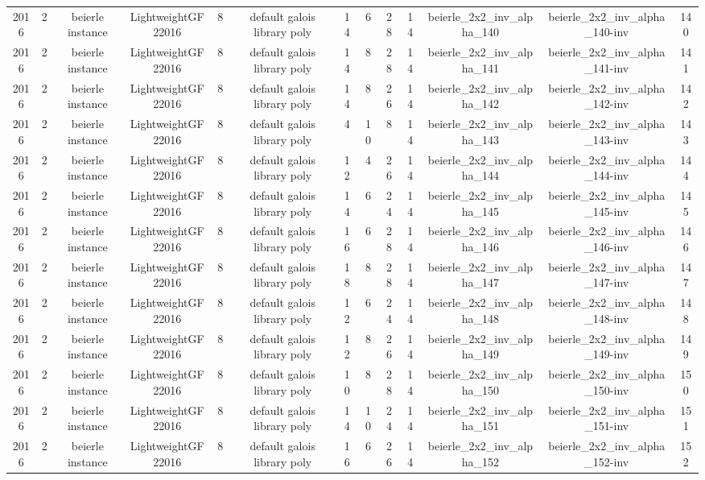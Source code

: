 \begin{tabular}{c c c c c c c c c c c c c}
2016 & 2 & beierle instance & LightweightGF22016 & 8 & default galois library poly & 14 & 6 & 28 & 14 & beierle_2x2_inv_alpha_140 & beierle_2x2_inv_alpha_140-inv & 140 \\
2016 & 2 & beierle instance & LightweightGF22016 & 8 & default galois library poly & 14 & 8 & 28 & 14 & beierle_2x2_inv_alpha_141 & beierle_2x2_inv_alpha_141-inv & 141 \\
2016 & 2 & beierle instance & LightweightGF22016 & 8 & default galois library poly & 14 & 8 & 26 & 14 & beierle_2x2_inv_alpha_142 & beierle_2x2_inv_alpha_142-inv & 142 \\
2016 & 2 & beierle instance & LightweightGF22016 & 8 & default galois library poly & 4 & 10 & 8 & 14 & beierle_2x2_inv_alpha_143 & beierle_2x2_inv_alpha_143-inv & 143 \\
2016 & 2 & beierle instance & LightweightGF22016 & 8 & default galois library poly & 12 & 4 & 26 & 14 & beierle_2x2_inv_alpha_144 & beierle_2x2_inv_alpha_144-inv & 144 \\
2016 & 2 & beierle instance & LightweightGF22016 & 8 & default galois library poly & 14 & 6 & 24 & 14 & beierle_2x2_inv_alpha_145 & beierle_2x2_inv_alpha_145-inv & 145 \\
2016 & 2 & beierle instance & LightweightGF22016 & 8 & default galois library poly & 16 & 6 & 28 & 14 & beierle_2x2_inv_alpha_146 & beierle_2x2_inv_alpha_146-inv & 146 \\
2016 & 2 & beierle instance & LightweightGF22016 & 8 & default galois library poly & 18 & 8 & 28 & 14 & beierle_2x2_inv_alpha_147 & beierle_2x2_inv_alpha_147-inv & 147 \\
2016 & 2 & beierle instance & LightweightGF22016 & 8 & default galois library poly & 12 & 6 & 24 & 14 & beierle_2x2_inv_alpha_148 & beierle_2x2_inv_alpha_148-inv & 148 \\
2016 & 2 & beierle instance & LightweightGF22016 & 8 & default galois library poly & 12 & 8 & 26 & 14 & beierle_2x2_inv_alpha_149 & beierle_2x2_inv_alpha_149-inv & 149 \\
2016 & 2 & beierle instance & LightweightGF22016 & 8 & default galois library poly & 10 & 8 & 28 & 14 & beierle_2x2_inv_alpha_150 & beierle_2x2_inv_alpha_150-inv & 150 \\
2016 & 2 & beierle instance & LightweightGF22016 & 8 & default galois library poly & 14 & 10 & 24 & 14 & beierle_2x2_inv_alpha_151 & beierle_2x2_inv_alpha_151-inv & 151 \\
2016 & 2 & beierle instance & LightweightGF22016 & 8 & default galois library poly & 16 & 6 & 26 & 14 & beierle_2x2_inv_alpha_152 & beierle_2x2_inv_alpha_152-inv & 152 \\

\end{tabular}
